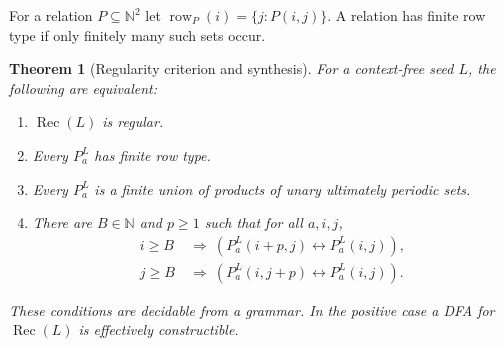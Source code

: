 \documentclass[11pt,letterpaper]{article}
\newtheorem{theorem}{Theorem}[section]
\theoremstyle{definition}
\theoremstyle{remark}
\newcommand{\N}{\mathbb N}
\newcommand{\rec}{\operatorname{Rec}}
\newcommand{\row}{\operatorname{row}}
\begin{document}
For a relation $P\subseteq\N^2$ let
$\row_P(i)=\{j:P(i,j)\}$. A relation has finite row type if only finitely
many such sets occur.

\begin{theorem}[Regularity criterion and synthesis]\label{ccc:cl:thm:regularity}
For a context-free seed $L$, the following are equivalent:
\begin{enumerate}[label=(\roman*)]
\item $\rec(L)$ is regular.
\item Every $P_a^L$ has finite row type.
\item Every $P_a^L$ is a finite union of products of unary ultimately
periodic sets.
\item There are $B\in\N$ and $p\ge1$ such that for all $a,i,j$,
\begin{align}
 i\ge B&\ \Longrightarrow\ (P_a^L(i+p,j)\leftrightarrow P_a^L(i,j)),\label{ccc:cl:eq:periodleft}\\
 j\ge B&\ \Longrightarrow\ (P_a^L(i,j+p)\leftrightarrow P_a^L(i,j)).\label{ccc:cl:eq:periodright}
\end{align}
\end{enumerate}
These conditions are decidable from a grammar. In the positive case a DFA
for $\rec(L)$ is effectively constructible.
\end{theorem}
\end{document}
